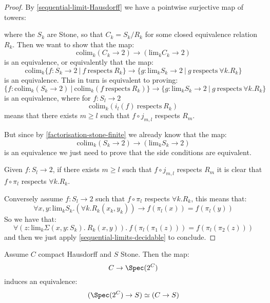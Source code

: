 \begin{proof}
By \cref{sequential-limit-Hausdorff} we have a pointwise surjective map of towers:
\begin{center}
\end{center}
where the $S_k$ are Stone, so that $C_k = S_k/R_k$ for some closed equivalence relation $R_k$. Then we want to show that the map:
\[\mathrm{colim}_k (C_k \to 2) \to (\mathrm{lim}_kC_k \to 2)\]
is an equivalence, or equivalently that the map:
\[\mathrm{colim}_k \{ f:S_k \to 2\ |\ f\ \mathrm{respects}\ R_k \}\to \{ g:\mathrm{lim}_kS_k \to 2\ |\ g\ \mathrm{respects}\ \forall k. R_k\}\]
is an equivalence. This in turn is equivalent to proving:
\[ \{ f : \mathrm{colim}_k (S_k \to 2)\ |\ \mathrm{colim}_k (f\ \mathrm{respects}\ R_k)\} \to \{ g:\mathrm{lim}_kS_k \to 2\ |\ g\ \mathrm{respects}\ \forall k. R_k\}\]
is an equivalence, where for $f:S_l\to 2$
\[\mathrm{colim}_k (i_l(f)\ \mathrm{respects}\ R_k)\]
means that there exists $m\geq l$ such that $f\circ j_{m,l}$ respects $R_m$.

But since by \cref{factorisation-stone-finite} we already know that the map:
\[\mathrm{colim}_k (S_k \to 2) \to (\mathrm{lim}_kS_k \to 2)\]
is an equivalence we just need to prove that the side conditions are equivalent.

Given $f:S_l\to 2$, if there exists $m\geq l$ such that $f\circ j_{m,l}$ respects $R_m$ it is clear that $f\circ \pi_l$ respects $\forall k. R_k$.

Conversely assume $f:S_l\to 2$ such that $f\circ \pi_l$ respects $\forall k. R_k$, this means that:
\[\forall x,y:\mathrm{lim}_k S_k. (\forall k. R_k(x_k,y_k) )\to f(\pi_l(x))=f(\pi_l(y))\]
So we have that:
\[\forall (z : \mathrm{lim}_k \Sigma(x,y:S_k).\ R_k(x,y)).\ f(\pi_l(\pi_1(z)))=f(\pi_l(\pi_2(z)))\]
and then we just apply \cref{sequential-limits-decidable} to conclude.
\end{proof}

\begin{lemma}
Assume $C$ compact Hausdorff and $S$ Stone. Then the map:
\[C\to \Spec(2^C)\]
induces an equivalence:
\[(\Spec(2^C) \to S) \simeq(C\to S) \]
\end{lemma}

